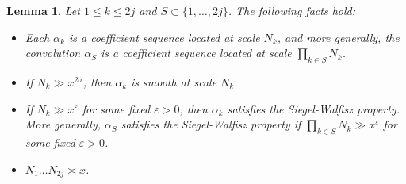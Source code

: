 \documentclass[12pt,a4paper,reqno]{amsart}
\numberwithin{equation}{section}
\theoremstyle{plain}
\newtheorem{lemma}[theorem]{Lemma}
\theoremstyle{definition}
\newcommand\eps{\varepsilon}
\renewcommand{\sim}{\asymp}
\begin{document}
\begin{lemma}\label{facts}  Let $1 \leq k \leq 2j$ and $S \subset
  \{1,\ldots,2j\}$. The following facts hold:
\begin{itemize}
\item[(i)] Each $\alpha_k$ is a coefficient sequence located at scale
  $N_k$, and more generally, the convolution $\alpha_S$ is a
  coefficient sequence located at scale $\prod_{k \in S} N_k$.
\item[(ii)] If $N_k \gg x^{2\sigma}$, then $\alpha_k$ is smooth at
  scale $N_k$.
\item[(iii)] If $N_k \gg x^\eps$ for some fixed $\eps>0$, then
  $\alpha_k$ satisfies the Siegel-Walfisz property.  More generally,
  $\alpha_S$ satisfies the Siegel-Walfisz property if $\prod_{k \in S}
  N_k \gg x^\eps$ for some fixed $\eps>0$.
\item[(iv)]  $N_1 \ldots N_{2j} \sim x$.
\end{itemize}
\end{lemma}
\end{document}
